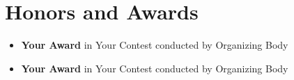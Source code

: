 \documentclass[a4paper,11pt]{article}
\newcommand{\resumeItem}[1]{
  \item\small{
    {#1 \vspace{-2pt}}
  }
}
\newcommand{\resumeItemListStart}{\begin{itemize}}
\newcommand{\resumeItemListEnd}{\end{itemize}\vspace{-5pt}}
\begin{document}
\vspace{-11pt}
\section{Honors and Awards}
  \resumeItemListStart[parsep = -2pt]
    \resumeItem{\textbf{Your Award} in Your Contest conducted by Organizing Body}
    \resumeItem{\textbf{Your Award} in Your Contest conducted by Organizing Body}
  \resumeItemListEnd

\end{document}
